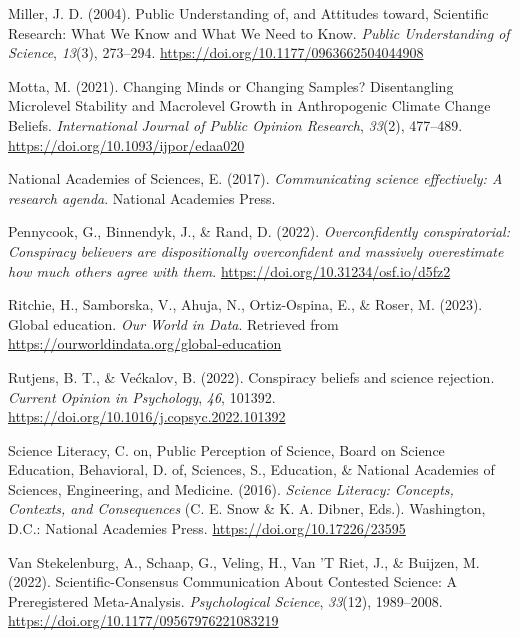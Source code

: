 \documentclass[
  doc,floatsintext]{apa6}
\newlength{\cslhangindent}
\newenvironment{CSLReferences}[2] %
 {\begin{list}{}{%
  \setlength{\itemindent}{0pt}
  \setlength{\leftmargin}{0pt}
  \setlength{\parsep}{0pt}
  \ifodd #1
   \setlength{\leftmargin}{\cslhangindent}
   \setlength{\itemindent}{-1\cslhangindent}
  \fi
  \setlength{\itemsep}{#2\baselineskip}}}
 {\end{list}}
\begin{document}
\begin{CSLReferences}{1}{0}
Miller, J. D. (2004). Public Understanding of, and Attitudes toward, Scientific Research: What We Know and What We Need to Know. \emph{Public Understanding of Science}, \emph{13}(3), 273--294. \url{https://doi.org/10.1177/0963662504044908}

Motta, M. (2021). Changing Minds or Changing Samples? Disentangling Microlevel Stability and Macrolevel Growth in Anthropogenic Climate Change Beliefs. \emph{International Journal of Public Opinion Research}, \emph{33}(2), 477--489. \url{https://doi.org/10.1093/ijpor/edaa020}

National Academies of Sciences, E. (2017). \emph{Communicating science effectively: A research agenda}. National Academies Press.

Pennycook, G., Binnendyk, J., \& Rand, D. (2022). \emph{Overconfidently conspiratorial: Conspiracy believers are dispositionally overconfident and massively overestimate how much others agree with them}. \url{https://doi.org/10.31234/osf.io/d5fz2}

Ritchie, H., Samborska, V., Ahuja, N., Ortiz-Ospina, E., \& Roser, M. (2023). Global education. \emph{Our World in Data}. Retrieved from \url{https://ourworldindata.org/global-education}

Rutjens, B. T., \& Većkalov, B. (2022). Conspiracy beliefs and science rejection. \emph{Current Opinion in Psychology}, \emph{46}, 101392. \url{https://doi.org/10.1016/j.copsyc.2022.101392}

Science Literacy, C. on, Public Perception of Science, Board on Science Education, Behavioral, D. of, Sciences, S., Education, \& National Academies of Sciences, Engineering, and Medicine. (2016). \emph{Science Literacy: Concepts, Contexts, and Consequences} (C. E. Snow \& K. A. Dibner, Eds.). Washington, D.C.: National Academies Press. \url{https://doi.org/10.17226/23595}

Van Stekelenburg, A., Schaap, G., Veling, H., Van 'T Riet, J., \& Buijzen, M. (2022). Scientific-Consensus Communication About Contested Science: A Preregistered Meta-Analysis. \emph{Psychological Science}, \emph{33}(12), 1989--2008. \url{https://doi.org/10.1177/09567976221083219}


\end{CSLReferences}
\end{document}
